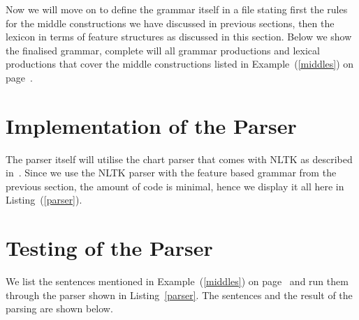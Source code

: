 \documentclass[12pt,%
]{lin-v2/lin}
\newcommand{\pref}[1]{(\ref{#1})}
\begin{document}
Now we will move on to define the grammar itself in a file stating first the rules for
the middle constructions we have discussed in previous sections, then the lexicon in
terms of feature structures as discussed in this section. Below we show the finalised
grammar, complete will all grammar productions and lexical productions that cover the
middle constructions listed in Example~\pref{middles} on page~\pageref{middles}.





\section{Implementation of the Parser}

The parser itself will utilise the chart parser that comes with NLTK as described in~\citep[Chapter 9]{nltk}.
Since we use the NLTK parser with the feature based grammar from the previous section,
the amount of code is minimal, hence we display it all here in Listing~\pref{parser}.




\section{Testing of the Parser}

We list the sentences mentioned in Example~\pref{middles} on page~\pageref{middles}
and run them through the parser shown in Listing~\ref{parser}. The sentences and
the result of the parsing are shown below.


\end{document}
